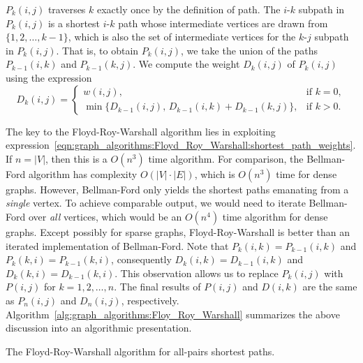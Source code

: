 $P_k(i,j)$ traverses $k$ exactly once by the definition of path. The
$i$-$k$ subpath in $P_k(i,j)$ is a shortest $i$-$k$ path whose
intermediate vertices are drawn from $\{1, 2, \dots, k-1\}$, which is
also the set of intermediate vertices for the $k$-$j$ subpath in
$P_k(i,j)$. That is, to obtain $P_k(i,j)$, we take the union of the
paths $P_{k-1}(i,k)$ and $P_{k-1}(k,j)$. We compute the weight
$D_k(i,j)$ of $P_k(i,j)$ using the expression
\begin{equation}
\label{eqn:graph_algorithms:Floyd_Roy_Warshall:shortest_path_weights}
D_k(i,j)
=
\begin{cases}
w(i,j), & \text{if $k = 0$}, \\
\min\{D_{k-1}(i,j),\, D_{k-1}(i,k) + D_{k-1}(k,j)\}, & \text{if $k > 0$}.
\end{cases}
\end{equation}

The key to the Floyd-Roy-Warshall
algorithm lies in exploiting
expression~\eqref{eqn:graph_algorithms:Floyd_Roy_Warshall:shortest_path_weights}.
If $n = |V|$, then this is a $O(n^3)$ time algorithm. For
comparison, the Bellman-Ford algorithm
has complexity $O(|V| \cdot |E|)$, which is $O(n^3)$ time for dense
graphs. However, Bellman-Ford only yields the
shortest paths emanating from a \emph{single} vertex. To achieve
comparable output, we would need to iterate Bellman-Ford over
\emph{all} vertices, which would be an  $O(n^4)$ time algorithm for
dense graphs. Except possibly for sparse
graphs,
Floyd-Roy-Warshall is better than
an iterated implementation of Bellman-Ford. Note that
$P_k(i,k) = P_{k-1}(i,k)$ and $P_k(k,i) = P_{k-1}(k,i)$, consequently
$D_k(i,k) = D_{k-1}(i,k)$ and $D_k(k,i) = D_{k-1}(k,i)$. This
observation allows us to replace $P_k(i,j)$ with $P(i,j)$ for
$k = 1, 2, \dots, n$. The final results of $P(i,j)$ and $D(i,k)$ are
the same as $P_n(i,j)$ and $D_n(i,j)$,
respectively. Algorithm~\ref{alg:graph_algorithms:Floy_Roy_Warshall}
summarizes the above discussion into an algorithmic presentation.

\begin{algorithm}[!htbp]

\caption{The Floyd-Roy-Warshall algorithm for all-pairs shortest paths.}
\label{alg:graph_algorithms:Floy_Roy_Warshall}
\end{algorithm}


